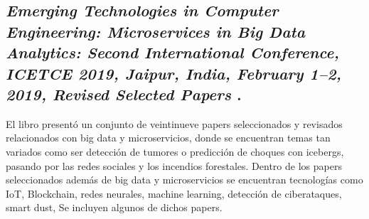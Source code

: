 

\subsection{
    \textbf{\emph{Emerging Technologies in Computer Engineering: Microservices in Big Data Analytics: Second International Conference, {ICETCE} 2019, Jaipur, India, February 1–2, 2019, Revised Selected Papers}
    }
    \cite{somani_emerging_2019}.
}

El libro presentó un conjunto de veintinueve papers seleccionados y revisados relacionados con big data y microservicios,
donde se encuentran temas tan variados como ser detección de tumores o predicción de choques con icebergs, pasando por las redes sociales y los incendios forestales.
Dentro de los papers seleccionados además de big data y microservicios se encuentran tecnologías como IoT, Blockchain,
redes neurales, machine learning, detección de ciberataques, smart dust,
Se incluyen algunos de dichos papers.\par








